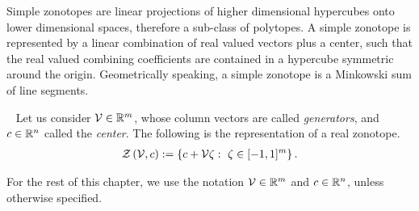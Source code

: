 Simple zonotopes are linear projections of higher dimensional
hypercubes onto lower dimensional spaces, therefore a sub-class of
polytopes.  A simple zonotope is represented by a linear combination
of real valued vectors plus a center, such that the real valued
combining coefficients are contained in a hypercube symmetric around
the origin.  Geometrically speaking, a simple zonotope is a Minkowski
sum of line segments.
%
\begin{definition}~\label{defn:rztope}
Let us consider $\mathcal{V}\in\mathbb{R}^m$, whose column vectors are called
\emph{generators}, and $c\in\mathbb{R}^n$ called the \emph{center}.  The following is the
representation of a real zonotope.
%
\begin{align*}
\mathit{\mathcal{Z}}\left(\mathcal{V},c\right):=\left\{c+\mathcal{V}\zeta:~\zeta\in[-1,1]^m\right\}.
\end{align*}
%
\end{definition}
%
For the rest of this chapter, we
use the notation $\mathcal{V}\in\mathbb{R}^m$ and $c\in\mathbb{R}^n$, unless
otherwise specified.

